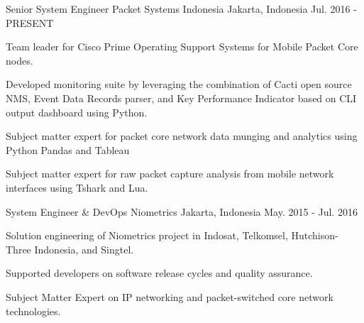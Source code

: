 

\begin{cventries}

  \cventry
    {Senior System Engineer} %
    {Packet Systems Indonesia} %
    {Jakarta, Indonesia} %
    {Jul. 2016 - PRESENT} %
    {
      \begin{cvitems} %
        \item {Team leader for Cisco Prime Operating Support Systems for Mobile Packet Core nodes.}
        \item {Developed monitoring suite by leveraging the combination of Cacti open source NMS, Event Data Records parser, and Key Performance Indicator based on CLI output dashboard using Python.}
        \item {Subject matter expert for packet core network data munging and analytics using Python Pandas and Tableau}
        \item {Subject matter expert for raw packet capture analysis from mobile network interfaces using Tshark and Lua.}
      \end{cvitems}
    }

  \cventry
    {System Engineer \& DevOps} %
    {Niometrics} %
    {Jakarta, Indonesia} %
    {May. 2015 - Jul. 2016} %
    {
      \begin{cvitems} %
        \item {Solution engineering of Niometrics project in Indosat, Telkomsel, Hutchison-Three Indonesia, and Singtel.}
        \item {Supported developers on software release cycles and quality assurance.}
        \item {Subject Matter Expert on IP networking and packet-switched core network technologies.}
      \end{cvitems}
    }


\end{cventries}
